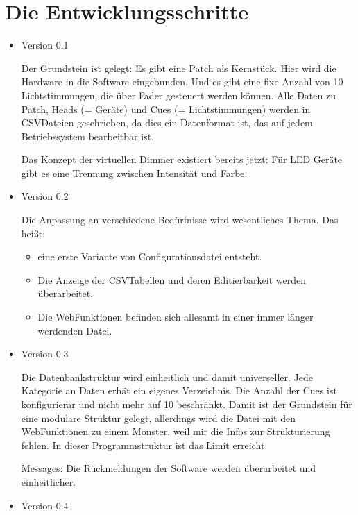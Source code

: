 \documentclass[letterpaper,10pt,ngerman]{sphinxmanual}
\begin{document}
\section{Die Entwicklungsschritte}
\label{\detokenize{history:die-entwicklungsschritte}}\begin{itemize}
\item {} 
Version 0.1

Der Grundstein ist gelegt: Es gibt eine Patch als Kernstück. Hier
wird die Hardware in die Software eingebunden.
Und es gibt eine fixe Anzahl von 10 Lichtstimmungen, die über
Fader gesteuert werden können. Alle Daten zu Patch, Heads (= Geräte) und
Cues (= Lichtstimmungen) werden in CSV\sphinxhyphen{}Dateien geschrieben, da dies ein
Datenformat ist, das auf jedem Betriebssystem bearbeitbar ist.

Das Konzept der virtuellen Dimmer existiert bereits jetzt: Für LED Geräte
gibt es eine Trennung zwischen Intensität und Farbe.

\item {} 
Version 0.2

Die Anpassung an verschiedene Bedürfnisse wird wesentliches Thema.
Das heißt:
\begin{itemize}
\item {} 
eine erste Variante von Configurationsdatei entsteht.

\item {} 
Die Anzeige der CSV\sphinxhyphen{}Tabellen und deren Editierbarkeit werden
überarbeitet.

\item {} 
Die Web\sphinxhyphen{}Funktionen befinden sich allesamt in einer immer länger
werdenden Datei.

\end{itemize}

\item {} 
Version 0.3

Die Datenbankstruktur wird einheitlich und damit universeller. Jede
Kategorie an Daten erhät ein eigenes Verzeichnis. Die Anzahl der Cues ist
konfigurierar und nicht mehr auf 10 beschränkt. Damit ist der Grundstein
für eine modulare Struktur gelegt, allerdings wird die Datei mit den
Web\sphinxhyphen{}Funktionen zu einem Monster, weil mir die Infos zur
Strukturierung fehlen. In dieser Programmstruktur ist das Limit erreicht.

Messages: Die Rückmeldungen der Software werden überarbeitet und
einheitlicher.

\item {} 
Version 0.4


\end{itemize}
\end{document}
